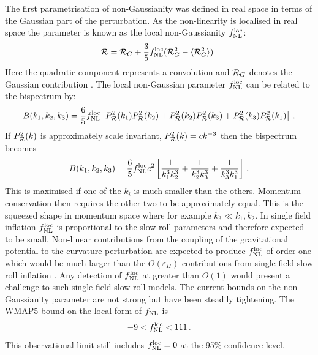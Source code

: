 The first parametrisation of non-Gaussianity was defined in
real space in terms of the Gaussian part of the perturbation. As the
non-linearity is localised in real space the parameter is
known as the local non-Gaussianity $f_{\mathrm{NL}}^\mathrm{loc}$: 
% 
\begin{equation} 
\label{eq:fnllocdefn-intro}
{\cal{R}} = {\cal{R}}_G + \frac{3}{5} f_{\mathrm{NL}}^\mathrm{loc}  (
{\cal{R}}_G^2 -\langle {\cal{R}}_G^2 \rangle )\,.
\end{equation}
Here the 
quadratic component represents a convolution and 
$\mathcal{R}_G$ denotes the Gaussian contribution \cite{maldacena}\footnotemark.
The local non-Gaussian parameter $f_{\mathrm{NL}}^\mathrm{loc}$ can be related to the bispectrum by:
\begin{equation}
 B(k_1, k_2, k_3) = \frac{6}{5}f_{\mathrm{NL}}^\mathrm{loc} \left[P_{\mathcal{R}}^2(k_1)P_{\mathcal{R}}^2(k_2) +
P_{\mathcal{R}}^2(k_2)P_{\mathcal{R}}^2(k_3) + P_{\mathcal{R}}^2(k_3)P_{\mathcal{R}}^2(k_1)\right]\,.
\end{equation}
% 
If $P_{\mathcal{R}}^2(k)$ is approximately scale invariant, $P_{\mathcal{R}}^2(k) = c k^{-3}$ then
the bispectrum becomes \cite{Baumann2009}
% 
\begin{equation}
 B(k_1, k_2, k_3) = \frac{6}{5}f_{\mathrm{NL}}^\mathrm{loc} c^2\left[\frac{1}{k_1^3 k_2^3} +
\frac{1}{k_2^3 k_3^3} + \frac{1}{k_3^3 k_1^3}\right]\,.
\end{equation}
% 
This is maximised if one of the $k_i$ is much smaller than the others. Momentum
conservation then requires the other two to be approximately equal. This is
the squeezed shape in momentum space where for example $k_3 \ll k_1,k_2$. In
single field inflation $f_{\mathrm{NL}}^\mathrm{loc}$ is proportional to the slow roll parameters
and therefore expected to be small. Non-linear contributions from the coupling
of the gravitational potential to the curvature perturbation are expected to
produce $f_{\mathrm{NL}}^\mathrm{loc}$ of order one which would be much larger than the
$O(\varepsilon_H)$ contributions from single field slow roll inflation
\cite{Bartolo:2004if, Komatsu:2008hk}. Any detection of $f_{\mathrm{NL}}^\mathrm{loc}$ at greater
than $O(1)$ would present a challenge to such single field slow-roll models. 
The current bounds on the non-Gaussianity parameter are not strong but have
been steadily tightening. The WMAP5 bound on the local form of $f_{\mathrm{NL}}$ is
% 
\begin{equation}
\label{eq:fnlloc-wmap5-intro}
 -9<f_{\mathrm{NL}}^\mathrm{loc}<111\,.
\end{equation}
% 
This observational limit still includes $f_{\mathrm{NL}}^\mathrm{loc}=0$ at the 95\% confidence level.


